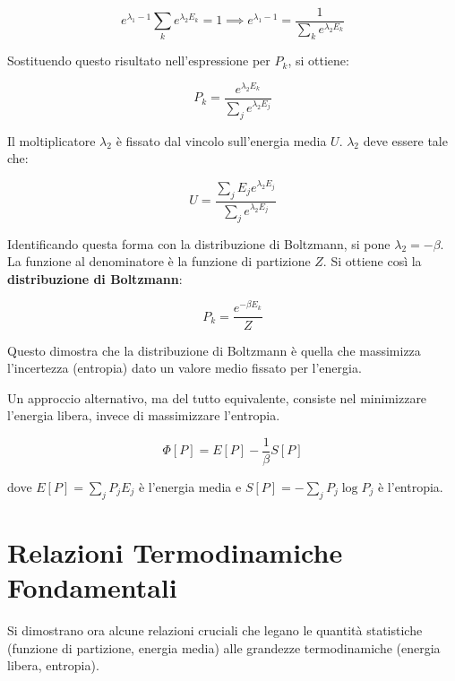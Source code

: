 \begin{equation}
e^{\lambda_1 - 1} \sum_k e^{\lambda_2 E_k} = 1 \implies e^{\lambda_1 - 1} = \frac{1}{\sum_k e^{\lambda_2 E_k}}
\end{equation}

Sostituendo questo risultato nell'espressione per $P_k$, si ottiene:

\begin{equation}
P_k = \frac{e^{\lambda_2 E_k}}{\sum_j e^{\lambda_2 E_j}}
\end{equation}

Il moltiplicatore $\lambda_2$ è fissato dal vincolo sull'energia media $U$. $\lambda_2$ deve essere tale che:

\begin{equation}
U = \frac{\sum_j E_j e^{\lambda_2 E_j}}{\sum_j e^{\lambda_2 E_j}}
\end{equation}

Identificando questa forma con la distribuzione di Boltzmann, si pone $\lambda_2 = -\beta$. La funzione al denominatore è la funzione di partizione $Z$. Si ottiene così la \textbf{distribuzione di Boltzmann}:

\begin{equation}
P_k = \frac{e^{-\beta E_k}}{Z}
\end{equation}

Questo dimostra che la distribuzione di Boltzmann è quella che massimizza l'incertezza (entropia) dato un valore medio fissato per l'energia.

\vspace{0.5 cm}
Un approccio alternativo, ma del tutto equivalente, consiste nel minimizzare l'energia libera, invece di massimizzare l'entropia. 

\begin{equation}
\Phi[P] = E[P] - \frac{1}{\beta}S[P]
\end{equation}

dove $E[P] = \sum_j P_j E_j$ è l'energia media e $S[P] = -\sum_j P_j \log P_j$ è l'entropia. 

\vspace{1 cm}
\section{Relazioni Termodinamiche Fondamentali}

Si dimostrano ora alcune relazioni cruciali che legano le quantità statistiche (funzione di partizione, energia media) alle grandezze termodinamiche (energia libera, entropia).

